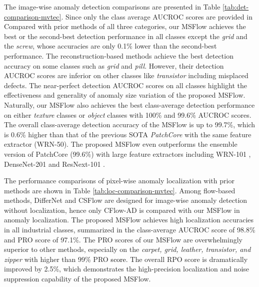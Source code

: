 \documentclass[lettersize,journal]{IEEEtran}
\newcommand{\rounda}[1]{\textcolor{black}{#1}}
\begin{document}
The image-wise anomaly detection comparisons are presented in Table \ref{tab:det-comparison-mvtec}. Since only the class average AUCROC scores are provided in  
Compared with prior methods of all three categories, our MSFlow achieves the best or the second-best detection performance in all classes except the \textit{grid} and the \textit{screw}, whose accuracies are only 0.1\% lower than the second-best performance. The reconstruction-based methods achieve the best detection accuracy on some classes such as \textit{grid} and \textit{pill}. However, their detection AUCROC scores are inferior on other classes like \textit{transistor} including misplaced defects. The near-perfect detection AUCROC scores on all classes highlight the effectiveness and generality of anomaly size variation of the proposed MSFlow.
Naturally, our MSFlow also achieves the best class-average detection performance on either \textit{texture} classes or \textit{object} classes with 100\% and 99.6\% AUCROC scores. The overall class-average detection accuracy of the MSFlow is up to 99.7\%, which is 0.6\% higher than that of the previous SOTA \textit{PatchCore} with the same feature extractor (WRN-50). The proposed MSFlow even outperforms the ensemble version of PatchCore (99.6\%) with large feature extractors including WRN-101 \cite{he2016resnet}, DenseNet-201\cite{huang2017densenet} and ResNext-101 \cite{xie2017resnext}. 

The performance comparisons of pixel-wise anomaly localization with prior methods are shown in Table \ref{tab:loc-comparison-mvtec}. Among flow-based methods, DifferNet\cite{rudolph2021differnet} and CSFlow\cite{rudolph2022csflow} are designed for image-wise anomaly detection without localization, hence only CFlow-AD\cite{gudovskiy2022cflow} is compared with our MSFlow in anomaly localization.
The proposed MSFlow achieves high localization accuracies in all industrial classes, summarized in the class-average AUCROC score of 98.8\% and PRO score of 97.1\%. 
The PRO scores of our MSFlow are overwhelmingly superior to other methods, especially on the \textit{carpet, grid, leather, transistor, and zipper} with higher than 99\% PRO \rounda{score}. The overall RPO score is dramatically improved by 2.5\%, which demonstrates the high-precision localization and noise suppression capability of the proposed MSFlow.
\end{document}
